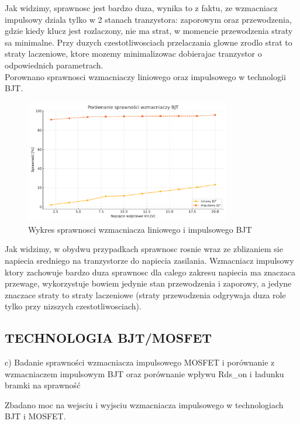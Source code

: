 \documentclass[11pt]{article}
\begin{document}
Jak widzimy, sprawnosc jest bardzo duza, wynika to z faktu, ze wzmacniacz impulsowy dziala tylko w 2 stanach tranzystora:
zaporowym oraz przewodzenia, gdzie kiedy klucz jest rozlaczony, nie ma strat, w momencie przewodzenia straty sa minimalne. Przy duzych czestotliwosciach przelaczania glowne zrodlo strat to straty laczeniowe, ktore mozemy minimalizowac dobierajac tranzystor o odpowiednich parametrach.\\

Porownano sprawnosci wzmacniaczy liniowego oraz impulsowego w technologii BJT.\\

\begin{figure}[H]
\centering
\includegraphics[width=0.8\textwidth]{aun1_liniowy_impulsowy_bjt.pdf}
\caption{Wykres sprawnosci wzmacniacza liniowego i impulsowego BJT}
\end{figure}

Jak widzimy, w obydwu przypadkach sprawnosc rosnie wraz ze zblizaniem sie napiecia sredniego na tranzystorze do napiecia zasilania. Wzmacniacz impulsowy ktory zachowuje bardzo duza sprawnosc dla calego zakresu napiecia ma znaczaca przewage,
wykorzystuje bowiem jedynie stan przewodzenia i zaporowy, a jedyne znaczace straty to straty laczeniowe
(straty przewodzenia odgrywaja duza role tylko przy nizszych czestotliwosciach).\\

\subsection{TECHNOLOGIA BJT/MOSFET}

c) Badanie sprawności wzmacniacza impulsowego MOSFET i porównanie z wzmacniaczem impulsowym BJT oraz porównanie wpływu Rds_on i ładunku bramki na sprawność

Zbadano moc na wejsciu i wyjsciu wzmacniacza impulsowego w technologiach BJT i MOSFET.\\
\end{document}

